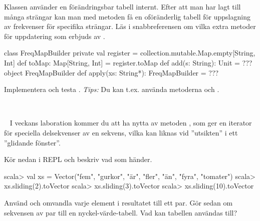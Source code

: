 Klassen använder en förändringsbar tabell internt. Efter att man har lagt till många strängar kan man med metoden  få en oföränderlig tabell för  uppslagning av frekvenser för specifika strängar. Läs i snabbreferensen om vilka extra metoder för uppdatering som erbjuds av .

\begin{Code}
class FreqMapBuilder {
  private val register = collection.mutable.Map.empty[String, Int]
  def toMap: Map[String, Int] = register.toMap
  def add(s: String): Unit = ???
}
object FreqMapBuilder {
  def apply(xs: String*): FreqMapBuilder = ???
}
\end{Code}

\noindent Implementera och testa . \emph{Tips:} Du kan t.ex. använda metoderna \code{+=} och .

\SOLUTION

\TaskSolved \what~\TODO

\QUESTEND




\QUESTBEGIN

\Task  \what~  I veckans laboration kommer du att ha nytta av metoden , som ger en iterator för speciella delsekvenser av en sekvens, vilka kan liknas vid ''utsikten'' i ett ''glidande fönster''.

\Subtask Kör nedan i REPL och beskriv vad som händer.

\begin{REPL}
scala> val xs = Vector("fem", "gurkor", "är", "fler", "än", "fyra", "tomater")
scala> xs.sliding(2).toVector
scala> xs.sliding(3).toVector
scala> xs.sliding(10).toVector
\end{REPL}

\Subtask Använd  och omvandla varje element i resultatet till ett par. Gör sedan om sekvensen av par till en nyckel-värde-tabell. Vad kan tabellen användas till?

\SOLUTION

\TaskSolved \what

